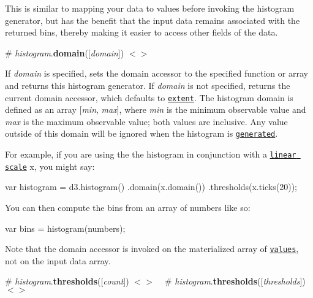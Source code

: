 This is similar to mapping your data to values before invoking the histogram generator, but has the benefit that the input data remains associated with the returned bins, thereby making it easier to access other fields of the data.

\label{_histogram_domain}%
\# {\itshape histogram}.{\bfseries domain}(\mbox{[}{\itshape domain}\mbox{]}) \href{https://github.com/d3/d3-array/blob/master/src/histogram.js#L62}{\tt $<$$>$}

If {\itshape domain} is specified, sets the domain accessor to the specified function or array and returns this histogram generator. If {\itshape domain} is not specified, returns the current domain accessor, which defaults to \href{#extent}{\tt extent}. The histogram domain is defined as an array \mbox{[}{\itshape min}, {\itshape max}\mbox{]}, where {\itshape min} is the minimum observable value and {\itshape max} is the maximum observable value; both values are inclusive. Any value outside of this domain will be ignored when the histogram is \href{#_histogram}{\tt generated}.

For example, if you are using the the histogram in conjunction with a \href{https://github.com/d3/d3-scale/blob/master/README.md#linear-scales}{\tt linear scale} {\ttfamily x}, you might say\+:


\begin{DoxyCode}
var histogram = d3.histogram()
    .domain(x.domain())
    .thresholds(x.ticks(20));
\end{DoxyCode}


You can then compute the bins from an array of numbers like so\+:


\begin{DoxyCode}
var bins = histogram(numbers);
\end{DoxyCode}


Note that the domain accessor is invoked on the materialized array of \href{#histogram_value}{\tt values}, not on the input data array.

\label{_histogram_thresholds}%
\# {\itshape histogram}.{\bfseries thresholds}(\mbox{[}{\itshape count}\mbox{]}) \href{https://github.com/d3/d3-array/blob/master/src/histogram.js#L66}{\tt $<$$>$} ~\newline
\label{_histogram_thresholds}%
\# {\itshape histogram}.{\bfseries thresholds}(\mbox{[}{\itshape thresholds}\mbox{]}) \href{https://github.com/d3/d3-array/blob/master/src/histogram.js#L66}{\tt $<$$>$}

